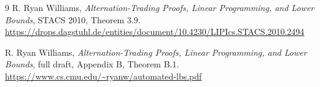 \documentclass[11pt]{article}
\begin{document}
\begin{thebibliography}{9}
R. Ryan Williams,
\emph{Alternation-Trading Proofs, Linear Programming, and Lower Bounds},
STACS 2010, Theorem 3.9.
\url{https://drops.dagstuhl.de/entities/document/10.4230/LIPIcs.STACS.2010.2494}

R. Ryan Williams,
\emph{Alternation-Trading Proofs, Linear Programming, and Lower Bounds},
full draft, Appendix B, Theorem B.1.
\url{https://www.cs.cmu.edu/~ryanw/automated-lbs.pdf}
\end{thebibliography}
\end{document}
